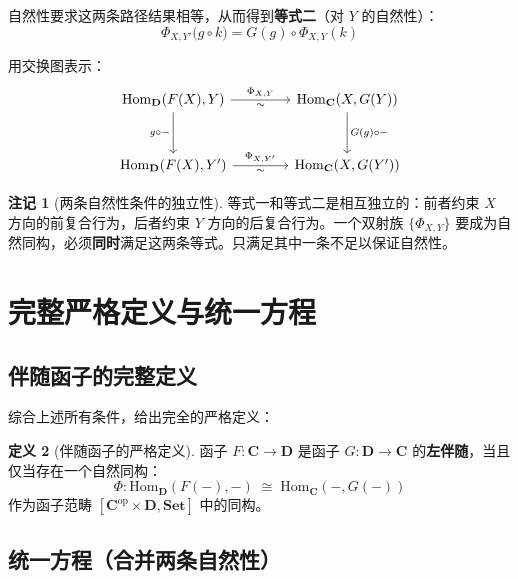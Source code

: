 \documentclass[12pt,a4paper]{ctexart}
\theoremstyle{definition}
\newtheorem{definition}{定义}[section]
\newtheorem{remark}[definition]{注记}
\newcommand{\cat}[1]{\mathbf{#1}}
\newcommand{\Set}{\cat{Set}}
\newcommand{\Hom}{\mathrm{Hom}}
\begin{document}
自然性要求这两条路径结果相等，从而得到\textbf{等式二}（对 $Y$ 的自然性）：
\begin{equation}\label{eq:natural-Y}
\boxed{\; \Phi_{X,Y'}\bigl(g \circ k\bigr) = G(g) \circ \Phi_{X,Y}(k) \;}
\end{equation}

用交换图表示：
\[
\begin{tikzcd}[column sep=4em, row sep=3em]
\Hom_{\cat{D}}(F(X), Y) \arrow[r,"\Phi_{X,Y}","\sim"'] \arrow[d,"g\circ-"'] & \Hom_{\cat{C}}(X, G(Y)) \arrow[d,"G(g)\circ-"] \\
\Hom_{\cat{D}}(F(X), Y') \arrow[r,"\Phi_{X,Y'}","\sim"'] & \Hom_{\cat{C}}(X, G(Y'))
\end{tikzcd}
\]

\begin{remark}[两条自然性条件的独立性]
等式一和等式二是相互独立的：前者约束 $X$ 方向的前复合行为，后者约束 $Y$ 方向的后复合行为。一个双射族 $\{\Phi_{X,Y}\}$ 要成为自然同构，必须\textbf{同时}满足这两条等式。只满足其中一条不足以保证自然性。
\end{remark}

\newpage

\section{完整严格定义与统一方程}

\subsection{伴随函子的完整定义}

综合上述所有条件，给出完全的严格定义：

\begin{definition}[伴随函子的严格定义]\label{def:adjunction-full}
函子 $F: \cat{C} \to \cat{D}$ 是函子 $G: \cat{D} \to \cat{C}$ 的\textbf{左伴随}，当且仅当存在一个自然同构：
\begin{equation}
\Phi: \Hom_{\cat{D}}(F(-), -) \;\cong\; \Hom_{\cat{C}}(-, G(-))
\end{equation}
作为函子范畴 $[\cat{C}^{\mathrm{op}} \times \cat{D}, \Set]$ 中的同构。
\end{definition}

\subsection{统一方程（合并两条自然性）}
\end{document}
